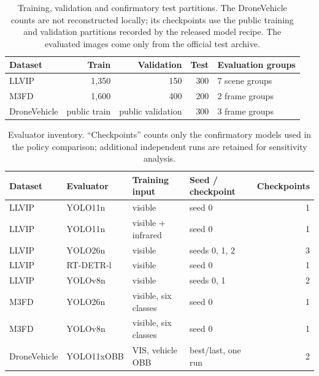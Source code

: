 \documentclass[preprint,11pt]{elsarticle}
\begin{document}
\begin{table}[t]
\centering
\small
\caption{Training, validation and confirmatory test partitions. The
DroneVehicle counts are not reconstructed locally; its checkpoints use the
public training and validation partitions recorded by the released model
recipe. The evaluated images come only from the official test archive.}
\label{tab:data}
\begin{tabular}{@{}lrrrl@{}}
\toprule
Dataset & Train & Validation & Test & Evaluation groups \\
\midrule
LLVIP & 1,350 & 150 & 300 & 7 scene groups \\
M3FD & 1,600 & 400 & 200 & 2 frame groups \\
DroneVehicle & public train & public validation & 300 & 3 frame groups \\
\bottomrule
\end{tabular}
\end{table}

\begin{table}[t]
\centering
\small
\caption{Evaluator inventory. ``Checkpoints'' counts only the confirmatory
models used in the policy comparison; additional independent runs are retained
for sensitivity analysis.}
\label{tab:evaluators}
\begin{tabular}{@{}>{\raggedright\arraybackslash}p{1.65cm}
>{\raggedright\arraybackslash}p{2.35cm}
>{\raggedright\arraybackslash}p{2.6cm}
>{\raggedright\arraybackslash}p{2.65cm}r@{}}
\toprule
Dataset & Evaluator & Training input & Seed / checkpoint & Checkpoints \\
\midrule
LLVIP & YOLO11n & visible & seed 0 & 1 \\
LLVIP & YOLO11n & visible + infrared & seed 0 & 1 \\
LLVIP & YOLO26n & visible & seeds 0, 1, 2 & 3 \\
LLVIP & RT-DETR-l & visible & seed 0 & 1 \\
LLVIP & YOLOv8n & visible & seeds 0, 1 & 2 \\
M3FD & YOLO26n & visible, six classes & seed 0 & 1 \\
M3FD & YOLOv8n & visible, six classes & seed 0 & 1 \\
Drone\-Vehicle & YOLO11x\-OBB & VIS, vehicle OBB & best/last, one run & 2 \\
\bottomrule
\end{tabular}
\end{table}
\end{document}
